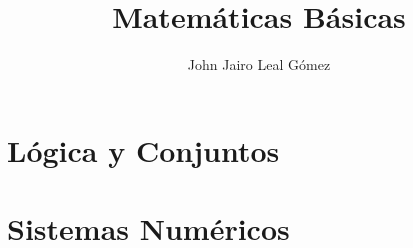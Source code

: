 \documentclass[12pt, letterpaper]{book}
\title{Matemáticas Básicas}
\author{John Jairo Leal Gómez}
\theoremstyle{definition}
\theoremstyle{plain}
\begin{document}
\maketitle


\chapter{Lógica y Conjuntos}



\chapter{Sistemas Numéricos} %


\end{document}
